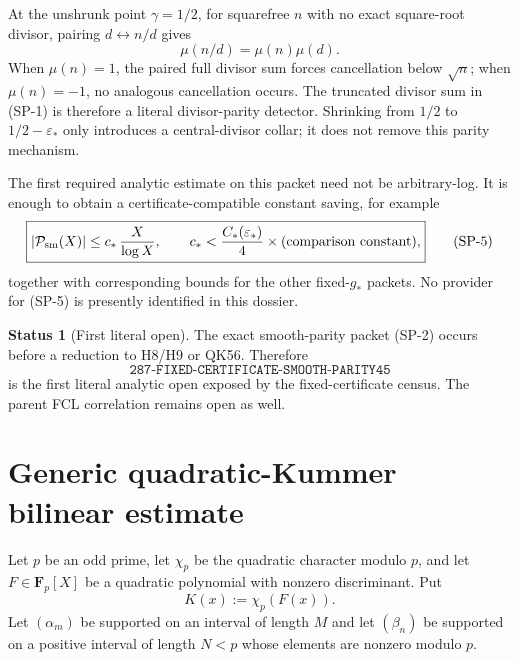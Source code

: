 \documentclass[11pt]{article}
\theoremstyle{definition}
\newtheorem{status}[theorem]{Status}
\theoremstyle{remark}
\newcommand{\1}{\mathbf 1}
\begin{document}
At the unshrunk point $\gamma=1/2$, for squarefree $n$ with no exact square-root divisor, pairing
$d\leftrightarrow n/d$ gives
\[
 \mu(n/d)=\mu(n)\mu(d).
\]
When $\mu(n)=1$, the paired full divisor sum forces cancellation below $\sqrt n$; when $\mu(n)=-1$, no analogous
cancellation occurs.  The truncated divisor sum in (SP-1) is therefore a literal divisor-parity detector.
Shrinking from $1/2$ to $1/2-\varepsilon_*$ only introduces a central-divisor collar; it does not remove this
parity mechanism.

The first required analytic estimate on this packet need not be arbitrary-log.  It is enough to obtain a
certificate-compatible constant saving, for example
\[
 \boxed{
 |\mathcal P_{\rm sm}(X)|
 \le c_*\,\frac{X}{\log X},
 \qquad
 c_*<
 \frac{C_*(\varepsilon_*)}{4}
 \times(\text{comparison constant}),
 }
 \tag{SP-5}
\]
together with corresponding bounds for the other fixed-$g_*$ packets.  No provider for (SP-5) is presently
identified in this dossier.

\begin{status}[First literal open]
The exact smooth-parity packet (SP-2) occurs before a reduction to H8/H9 or QK56.  Therefore
\[
 \boxed{\texttt{287-FIXED-CERTIFICATE-SMOOTH-PARITY45}}
\]
is the first literal analytic open exposed by the fixed-certificate census.  The parent FCL correlation remains
open as well.
\end{status}

\section{Generic quadratic-Kummer bilinear estimate}\label{sec:kummer}

Let $p$ be an odd prime, let $\chi_p$ be the quadratic character modulo $p$, and let
$F\in\mathbf F_p[X]$ be a quadratic polynomial with nonzero discriminant.  Put
\[
 K(x):=\chi_p(F(x)).
\]
Let $(\alpha_m)$ be supported on an interval of length $M$ and let $(\beta_n)$ be supported on a positive
interval of length $N<p$ whose elements are nonzero modulo $p$.
\end{document}
